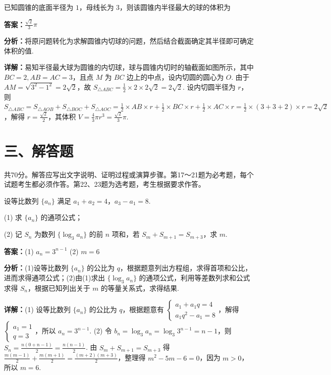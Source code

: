 \begin{question}[points=5]
已知圆锥的底面半径为 $1$，母线长为 $3$，则该圆锥内半径最大的球的体积为
\begin{solution}
\textbf{答案：}$\frac{\sqrt{2}}{3}\pi$

\textbf{分析：}将原问题转化为求解圆锥内切球的问题，然后结合截面确定其半径即可确定体积的值.

\textbf{详解：}易知半径最大球为圆锥的内切球，球与圆锥内切时的轴截面如图所示，其中 $BC=2,AB=AC=3$，且点 $M$ 为 $BC$ 边上的中点，设内切圆的圆心为 $O$. 由于 $AM=\sqrt{3^2-1^2}=2\sqrt{2}$，故 $S_{\triangle ABC}=\frac{1}{2}\times2\times2\sqrt{2}=2\sqrt{2}$. 设内切圆半径为 $r$，则 $S_{\triangle ABC}=S_{\triangle AOB}+S_{\triangle BOC}+S_{\triangle AOC}=\frac{1}{2}\times AB\times r+\frac{1}{2}\times BC\times r+\frac{1}{2}\times AC\times r=\frac{1}{2}\times(3+3+2)\times r=2\sqrt{2}$，解得 $r=\frac{\sqrt{2}}{2}$，其体积 $V=\frac{4}{3}\pi r^3=\frac{\sqrt{2}}{3}\pi$.
\end{solution}
\end{question}

\section*{三、解答题}
共70分。解答应写出文字说明、证明过程或演算步骤。第17～21题为必考题，每个试题考生都必须作答。第22、23题为选考题，考生根据要求作答。

\begin{question}[points=12]
设等比数列 $\{a_n\}$ 满足 $a_1+a_2=4$，$a_3-a_1=8$.

(1) 求 $\{a_n\}$ 的通项公式；

(2) 记 $S_n$ 为数列 $\{\log_3 a_n\}$ 的前 $n$ 项和，若 $S_m+S_{m+1}=S_{m+3}$，求 $m$.
\begin{solution}
\textbf{答案：}(1) $a_n=3^{n-1}$ (2) $m=6$

\textbf{分析：}(1)设等比数列 $\{a_n\}$ 的公比为 $q$，根据题意列出方程组，求得首项和公比，进而求得通项公式；(2)由(1)求出 $\{\log_3 a_n\}$ 的通项公式，利用等差数列求和公式求得 $S_n$，根据已知列出关于 $m$ 的等量关系式，求得结果.

\textbf{详解：}(1) 设等比数列 $\{a_n\}$ 的公比为 $q$，根据题意有 $\begin{cases} a_1+a_1q=4 \\ a_1q^2-a_1=8 \end{cases}$，解得 $\begin{cases} a_1=1 \\ q=3 \end{cases}$，所以 $a_n=3^{n-1}$.
(2) 令 $b_n=\log_3 a_n=\log_3 3^{n-1}=n-1$，则 $S_n=\frac{n(0+n-1)}{2}=\frac{n(n-1)}{2}$. 由 $S_m+S_{m+1}=S_{m+3}$ 得 $\frac{m(m-1)}{2}+\frac{m(m+1)}{2}=\frac{(m+2)(m+3)}{2}$，整理得 $m^2-5m-6=0$，因为 $m>0$，所以 $m=6$.
\end{solution}
\end{question}

